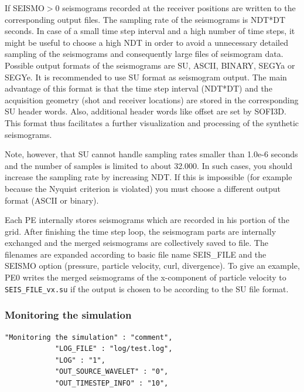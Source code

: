 \documentclass[11pt,onecolumn,oneside]{article}
\begin{document}
If SEISMO$>$0 seismograms recorded at the receiver positions are written to the corresponding output files. The sampling rate of the seismograms is NDT*DT seconds. In case of a small
time step interval and a high number of time steps, it might be useful to choose a high NDT in order to avoid a unnecessary detailed sampling of the seismograms and consequently large files of seismogram data. Possible output formats of the seismograms are SU, ASCII, BINARY, SEGYa or SEGYe. It is recommended to use SU format as seismogram output. The main advantage of this format is that the
time step interval (NDT*DT) and the acquisition geometry (shot and receiver locations) are stored in the corresponding SU header words. Also, additional header words like offset are set by SOFI3D. This format thus facilitates a further visualization and processing of the synthetic seismograms.

Note, however, that SU cannot handle sampling rates smaller than 1.0e-6 seconds and the number of samples is limited to about 32.000. In such cases, you should increase the sampling rate by increasing NDT. If this is impossible (for example because the Nyquist criterion is violated) you must choose a different output format (ASCII or binary).

Each PE internally stores seismograms which are recorded in his portion of the grid. After finishing the time step loop, the seismogram parts are internally exchanged and the merged seismograms are collectively saved to file. The filenames are expanded according to basic file name SEIS\_FILE and the SEISMO option (pressure, particle velocity, curl, divergence). To give an example, PE0 writes the merged seismograms of the x-component of particle velocity to  \lstinline{SEIS_FILE_vx.su} if the output is chosen to be according to the SU file format. 


\subsubsection{Monitoring the simulation}
\begin{verbatim}
"Monitoring the simulation" : "comment",
			"LOG_FILE" : "log/test.log",
			"LOG" : "1",
			"OUT_SOURCE_WAVELET" : "0",
			"OUT_TIMESTEP_INFO" : "10",

\end{verbatim}
\end{document}
